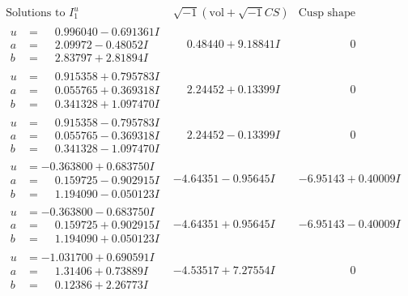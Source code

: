 \documentclass[1p]{elsarticle_modified}
\theoremstyle{definition}
\newcommand{\I}{\sqrt{-1}}
\begin{document}
$$\begin{array}{c|c|c}
\text{Solutions to }I^u_{1}& \I (\text{vol} + \sqrt{-1}CS) & \text{Cusp shape}\\
 \hline 
\begin{aligned}
u &= \phantom{-}0.996040 - 0.691361 I \\
a &= \phantom{-}2.09972 - 0.48052 I \\
b &= \phantom{-}2.83797 + 2.81894 I\end{aligned}
 & \phantom{-}0.48440 + 9.18841 I & \phantom{-0.000000 } 0 \\ \hline\begin{aligned}
u &= \phantom{-}0.915358 + 0.795783 I \\
a &= \phantom{-}0.055765 + 0.369318 I \\
b &= \phantom{-}0.341328 + 1.097470 I\end{aligned}
 & \phantom{-}2.24452 + 0.13399 I & \phantom{-0.000000 } 0 \\ \hline\begin{aligned}
u &= \phantom{-}0.915358 - 0.795783 I \\
a &= \phantom{-}0.055765 - 0.369318 I \\
b &= \phantom{-}0.341328 - 1.097470 I\end{aligned}
 & \phantom{-}2.24452 - 0.13399 I & \phantom{-0.000000 } 0 \\ \hline\begin{aligned}
u &= -0.363800 + 0.683750 I \\
a &= \phantom{-}0.159725 - 0.902915 I \\
b &= \phantom{-}1.194090 - 0.050123 I\end{aligned}
 & -4.64351 - 0.95645 I & -6.95143 + 0.40009 I \\ \hline\begin{aligned}
u &= -0.363800 - 0.683750 I \\
a &= \phantom{-}0.159725 + 0.902915 I \\
b &= \phantom{-}1.194090 + 0.050123 I\end{aligned}
 & -4.64351 + 0.95645 I & -6.95143 - 0.40009 I \\ \hline\begin{aligned}
u &= -1.031700 + 0.690591 I \\
a &= \phantom{-}1.31406 + 0.73889 I \\
b &= \phantom{-}0.12386 + 2.26773 I\end{aligned}
 & -4.53517 + 7.27554 I & \phantom{-0.000000 } 0 \\ \hline\begin{aligned}

\end{aligned}
\end{array}$$
\end{document}
